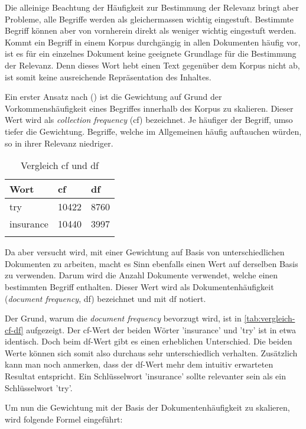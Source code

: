 Die alleinige Beachtung der Häufigkeit zur Bestimmung der Relevanz bringt aber Probleme, alle Begriffe werden als gleichermassen wichtig eingestuft. Bestimmte Begriff können aber von vornherein direkt als weniger wichtig eingestuft werden. Kommt ein Begriff in einem Korpus durchgängig in allen Dokumenten häufig vor, ist es für ein einzelnes Dokument keine geeignete Grundlage für die Bestimmung der Relevanz. Denn dieses Wort hebt einen Text gegenüber dem Korpus nicht ab, ist somit keine ausreichende Repräsentation des Inhaltes.

Ein erster Ansatz nach (\cite{manning2008introduction}) ist die Gewichtung auf Grund der Vorkommenshäufigkeit eines Begriffes innerhalb des Korpus zu skalieren. Dieser Wert wird als \textit{collection frequency} (cf) bezeichnet. Je häuf\-iger der Begriff, umso tiefer die Gewichtung. Begriffe, welche im Allgemeinen häufig auftauchen würden, so in ihrer Relevanz niedriger. 

\begin{longtable}{|p{2cm}| p{1.2cm} | p{1cm}|}
  \hline
    Wort & cf & df \\\hline
    try & 10422 & 8760 \\\hline
    insurance & 10440 & 3997 \\\hline
    \caption{Vergleich cf und df \protect\footnotemark
    }
  \label{tab:vergleich-cf-df}
\end{longtable}


Da aber versucht wird, mit einer Gewichtung auf Basis von unterschiedlichen Dokumenten zu arbeiten, macht es Sinn ebenfalls einen Wert auf derselben Basis zu verwenden. Darum wird die Anzahl Dokumente verwendet, welche einen bestimmten Begriff enthalten. Dieser Wert wird als Dokumentenhäufigkeit (\textit{document frequency}, df) bezeichnet und mit $\text{df}$ notiert.

Der Grund, warum die \textit{document frequency} bevorzugt wird, ist in \autoref{tab:vergleich-cf-df} aufgezeigt. Der cf-Wert der beiden Wörter 'insurance' und 'try' ist in etwa identisch. Doch beim df-Wert gibt es einen erheblichen Unterschied. Die beiden Werte können sich somit also durchaus sehr unterschiedlich verhalten. Zusätzlich kann man noch anmerken, dass der df-Wert mehr dem intuitiv erwarteten Resultat entspricht. Ein Schlüsselwort 'insurance' sollte relevanter sein als ein Schlüsselwort 'try'.

Um nun die Gewichtung mit der Basis der Dokumentenhäufigkeit zu skalieren, wird folgende Formel eingeführt:

